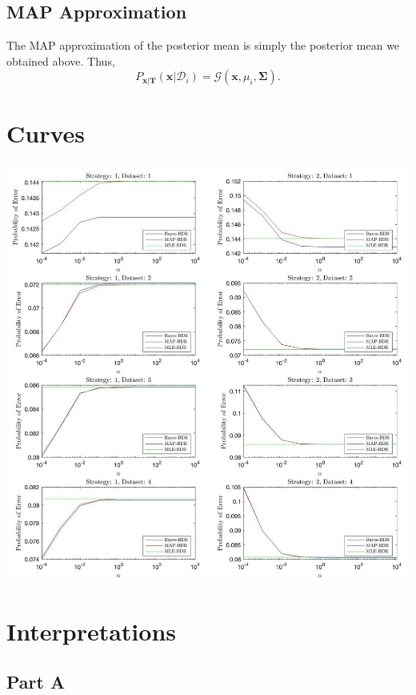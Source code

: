 \documentclass{article}
\newcommand*{\G}{\mathcal{G}}
\newcommand*{\D}{\mathcal{D}}
\begin{document}
\subsection*{MAP Approximation}

The MAP approximation of the posterior mean is simply the posterior mean we obtained above. Thus,
\[
    P_{\mathbf{x}|\mathbf{T}}(\mathbf{x}|\D_i) = \G(\mathbf{x}, \mu_{i}, \mathbf{\Sigma}).
\]

\pagebreak

\section*{Curves}

\begin{center}
    \includegraphics[width=\textwidth]{poe}
\end{center}

\pagebreak

\section*{Interpretations}

\subsection*{Part A}
\end{document}
